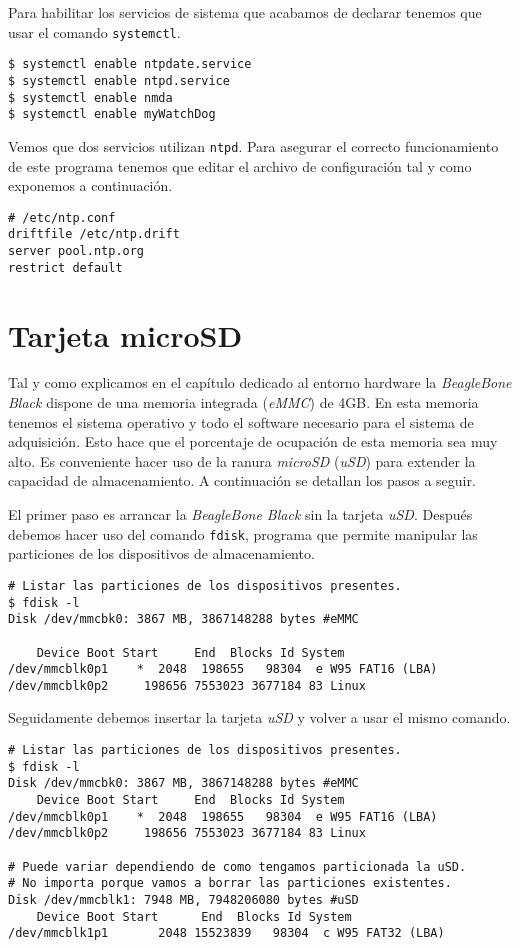 		Para habilitar los servicios de sistema que acabamos de declarar tenemos que usar el comando \texttt{systemctl}.
		\begin{lstlisting}[style=myBash]
$ systemctl enable ntpdate.service
$ systemctl enable ntpd.service
$ systemctl enable nmda
$ systemctl enable myWatchDog
		\end{lstlisting}
		Vemos que dos servicios utilizan \texttt{ntpd}. Para asegurar el correcto funcionamiento de este programa tenemos que editar el
		archivo de configuración tal y como exponemos a continuación.
		\begin{lstlisting}[style=myFile]
# /etc/ntp.conf
driftfile /etc/ntp.drift
server pool.ntp.org
restrict default
		\end{lstlisting}
	\section{Tarjeta microSD}
		Tal y como explicamos en el capítulo dedicado al entorno hardware la \emph{BeagleBone Black} dispone de una memoria integrada
		(\emph{eMMC}) de 4GB. En esta memoria tenemos el sistema operativo y todo el software necesario para el sistema de adquisición. Esto
		hace que el porcentaje de ocupación de esta memoria sea muy alto. Es conveniente hacer uso de la ranura \emph{microSD} (\emph{uSD}) para extender
		la capacidad de almacenamiento. A continuación se detallan los pasos a seguir.
		\par
		El primer paso es arrancar la \emph{BeagleBone Black} sin la tarjeta \emph{uSD}. Después debemos hacer uso del comando \texttt{fdisk}, programa que
		permite manipular las particiones de los dispositivos de almacenamiento.
		\begin{lstlisting}[style=myBash]
# Listar las particiones de los dispositivos presentes.
$ fdisk -l
Disk /dev/mmcbk0: 3867 MB, 3867148288 bytes #eMMC

	Device Boot Start     End  Blocks Id System
/dev/mmcblk0p1    *  2048  198655   98304  e W95 FAT16 (LBA)
/dev/mmcblk0p2     198656 7553023 3677184 83 Linux
		\end{lstlisting}
		Seguidamente debemos insertar la tarjeta \emph{uSD} y volver a usar el mismo comando.
		\begin{lstlisting}[style=myBash]
# Listar las particiones de los dispositivos presentes.
$ fdisk -l
Disk /dev/mmcbk0: 3867 MB, 3867148288 bytes #eMMC
	Device Boot Start     End  Blocks Id System
/dev/mmcblk0p1    *  2048  198655   98304  e W95 FAT16 (LBA)
/dev/mmcblk0p2     198656 7553023 3677184 83 Linux

# Puede variar dependiendo de como tengamos particionada la uSD.
# No importa porque vamos a borrar las particiones existentes.
Disk /dev/mmcblk1: 7948 MB, 7948206080 bytes #uSD
	Device Boot Start      End  Blocks Id System
/dev/mmcblk1p1       2048 15523839   98304  c W95 FAT32 (LBA)
		\end{lstlisting}
